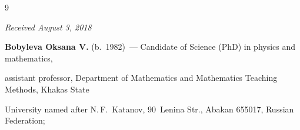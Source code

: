{{\begin{thebibliography}{9}




















\end{thebibliography}


} }








\vspace*{-8pt}





\hfill{\small\textit{Received August 3, 2018}} 





\vspace*{-16pt}








\Contr





\vspace*{-5pt}





\noindent


\textbf{Bobyleva Oksana V.} (b.\ 1982)~--- Candidate of Science (PhD) in  physics and mathematics, 


assistant professor, Department of Mathematics and Mathematics Teaching Methods, Khakas State 


University named after N.\,F.~Katanov, 90~Lenina Str., Abakan 655017, Russian Federation; 


